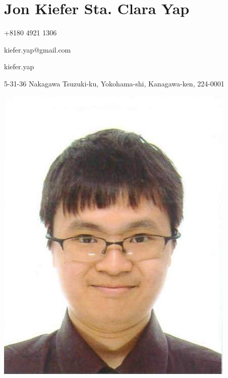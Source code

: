 
\section*{\hfill Jon Kiefer Sta. Clara Yap \hfill}

\begin{description}
  \begin{minipage}{0.8\linewidth}   
    \item[\faPhone] +8180 4921 1306
    \item[\faEnvelope] kiefer.yap@gmail.com
    \item[\faSkype] kiefer.yap
    \item[\faHome] 5-31-36 Nakagawa Tsuzuki-ku, Yokohama-shi, Kanagawa-ken, 224-0001
  \end{minipage}
  \begin{minipage}{0.2\linewidth}
    \begin{flushright}
    \includegraphics[scale=0.7]{photo}
    \end{flushright}     
  \end{minipage}
\end{description}

 
